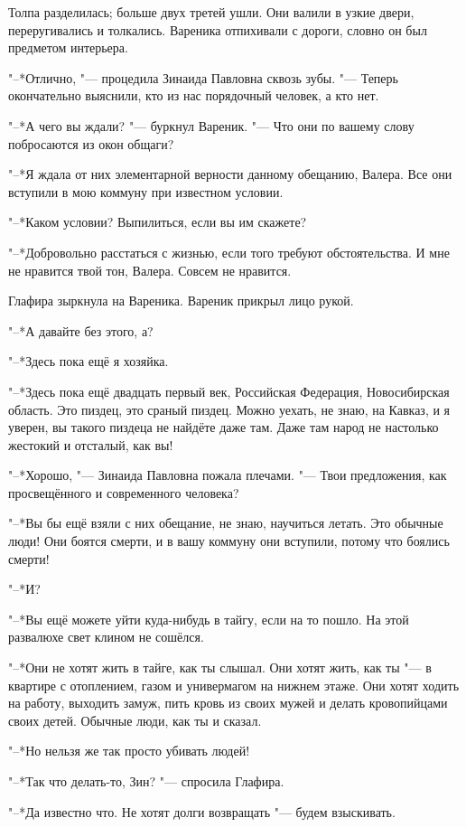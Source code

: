 Толпа разделилась;
больше двух третей ушли.
Они валили в узкие двери, переругивались и толкались.
Вареника отпихивали с дороги, словно он был предметом интерьера.

"--*Отлично, "--- процедила Зинаида Павловна сквозь зубы.
"--- Теперь окончательно выяснили, кто из нас порядочный человек, а кто нет.

"--*А чего вы ждали? "--- буркнул Вареник.
"--- Что они по вашему слову побросаются из окон общаги?

"--*Я ждала от них элементарной верности данному обещанию, Валера.
Все они вступили в мою коммуну при известном условии.

"--*Каком условии?
Выпилиться, если вы им скажете?

"--*Добровольно расстаться с жизнью, если того требуют обстоятельства.
И мне не нравится твой тон, Валера.
Совсем не нравится.

Глафира зыркнула на Вареника.
Вареник прикрыл лицо рукой.

"--*А давайте без этого, а?

"--*Здесь пока ещё я хозяйка.

"--*Здесь пока ещё двадцать первый век, Российская Федерация, Новосибирская область.
Это пиздец, это сраный пиздец.
Можно уехать, не знаю, на Кавказ, и я уверен, вы такого пиздеца не найдёте даже там.
Даже там народ не настолько жестокий и отсталый, как вы!

"--*Хорошо, "--- Зинаида Павловна пожала плечами.
"--- Твои предложения, как просвещённого и современного человека?

"--*Вы бы ещё взяли с них обещание, не знаю, научиться летать.
Это обычные люди!
Они боятся смерти, и в вашу коммуну они вступили, потому что боялись смерти!

"--*И?

"--*Вы ещё можете уйти куда-нибудь в тайгу, если на то пошло.
На этой развалюхе свет клином не сошёлся.

"--*Они не хотят жить в тайге, как ты слышал.
Они хотят жить, как ты "--- в квартире с отоплением, газом и универмагом на нижнем этаже.
Они хотят ходить на работу, выходить замуж, пить кровь из своих мужей и делать кровопийцами своих детей.
Обычные люди, как ты и сказал.

"--*Но нельзя же так просто убивать людей!

"--*Так что делать-то, Зин? "--- спросила Глафира.

"--*Да известно что.
Не хотят долги возвращать "--- будем взыскивать.

